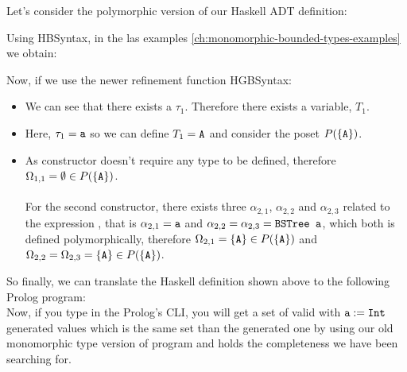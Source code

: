 	\begin{example}
		Let's consider the polymorphic version of our  Haskell ADT definition:
		
		Using HBSyntax, in the las examples \ref{ch:monomorphic-bounded-types-examples} we obtain:
		
		Now, if we use the newer refinement function HGBSyntax:
		\begin{itemize}
			\item We can see that there exists a $\tau_1$. Therefore there exists a variable, $T_1$.
			\item Here, $\tau_1 = \texttt{a}$ so we can define $T_1 = \texttt{A}$ and consider the poset $P(\{\texttt{A}\})$.
			\item As  constructor doesn't require any type to be defined, therefore $\Omega_{1,1} = \emptyset \in P(\{ \texttt{A} \})$. \\\\
			      For the second constructor, there exists three $\alpha_{2,1}$, $\alpha_{2,2}$ and $\alpha_{2,3}$ related to the expression , that is $\alpha_{2,1} = \texttt{a}$ and $\alpha_{2,2} = \alpha_{2,3} = \texttt{BSTree a}$, which both is defined polymorphically, therefore $\Omega_{2,1} = \{\texttt{A}\} \in P(\{ \texttt{A} \})$ and $\Omega_{2,2} = \Omega_{2,3} = \{\texttt{A}\} \in P(\{ \texttt{A} \})$.
		\end{itemize}
		So finally, we can translate the Haskell definition shown above to the following Prolog program:\\
		
		Now, if you type  in the Prolog's CLI, you will get a set of valid  with $\texttt{a} := \texttt{Int}$ generated values which is the same set than the generated one by using our old monomorphic type version of  program and holds the completeness we have been searching for.\\
	\end{example}
